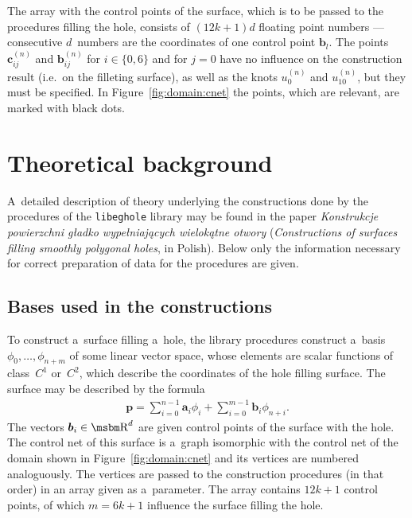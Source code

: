The array with the control points of the surface, which is to be passed to
the procedures filling the hole, consists of $(12k+1)d$ floating point numbers
--- consecutive $d$~numbers are the coordinates of one control point
$\bm{b}_l$. The points $\bm{c}^{(n)}_{ij}$ and $\bm{b}^{(n)}_{ij}$
for $i\in\{0,6\}$ and for $j=0$ have no influence on the construction result
(i.e.\ on the filleting surface), as well as the knots $u^{(n)}_0$ and
$u^{(n)}_{10}$, but they must be specified. In Figure~\ref{fig:domain:cnet}
the points, which are relevant, are marked with black dots.


\section{Theoretical background}

A~detailed description of theory underlying the constructions done by the
procedures of the \texttt{libeghole} library may be found in the paper
\emph{Konstrukcje powierzchni g\l adko wype\l niaj\k{a}cych wielok\k{a}tne otwory}
(\emph{Constructions of surfaces filling smoothly polygonal holes}, in
Polish). Below only the information necessary for correct preparation of
data for the procedures are given.

\subsection{Bases used in the constructions}

\begin{sloppypar}
To construct a~surface filling a~hole, the library procedures
construct a~basis $\phi_0,\ldots,\phi_{n+m}$ of some linear vector space,
whose elements are scalar functions of class~$C^1$ or~$C^2$,
which describe the coordinates of the hole filling surface.
The surface may be described by the formula
\begin{align}\label{eq:G2:surface}
  \bm{p} =
  \sum_{i=0}^{n-1}\bm{a}_i\phi_i+\sum_{i=0}^{m-1}\bm{b}_i\phi_{n+i}.
\end{align}
The vectors $\bm{b}_i\in\R^d$ are given control points of the surface
with the hole. The control net of this surface is a~graph isomorphic with
the control net of the domain shown in Figure~\ref{fig:domain:cnet}
and its vertices are numbered analoguously.
The vertices are passed to the construction procedures (in that order) in an
array given as a~parameter. The array contains $12k+1$ control points, of
which $m=6k+1$ influence the surface filling the hole.%
\end{sloppypar}

